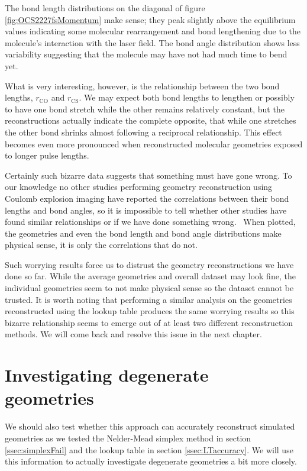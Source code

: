 The bond length distributions on the diagonal of figure \ref{fig:OCS2227fsMomentum} make sense; they peak slightly above the equilibrium values indicating some molecular rearrangement and bond lengthening due to the molecule's interaction with the laser field. The bond angle distribution shows less variability suggesting that the molecule may have not had much time to bend yet. %

What is very interesting, however, is the relationship between the two bond lengths, $r_\mathrm{CO}$ and $r_\mathrm{CS}$. We may expect both bond lengths to lengthen or possibly to have one bond stretch while the other remains relatively constant, but the reconstructions actually indicate the complete opposite, that while one stretches the other bond shrinks almost following a reciprocal relationship. This effect becomes even more pronounced when reconstructed molecular geometries exposed to longer pulse lengths.

Certainly such bizarre data suggests that something must have gone wrong. To our knowledge no other studies performing geometry reconstruction using Coulomb explosion imaging have reported the correlations between their bond lengths and bond angles, so it is impossible to tell whether other studies have found similar relationships or if we have done something wrong.\footnotemark~ When plotted, the geometries and even the bond length and bond angle distributions make physical sense, it is only the correlations that do not.


Such worrying results force us to distrust the geometry reconstructions we have done so far. While the average geometries and overall dataset may look fine, the individual geometries seem to not make physical sense so the dataset cannot be trusted. It is worth noting that performing a similar analysis on the geometries reconstructed using the lookup table produces the same worrying results so this bizarre relationship seems to emerge out of at least two different reconstruction methods. We will come back and resolve this issue in the next chapter.

\section{Investigating degenerate geometries}
We should also test whether this approach can accurately reconstruct simulated geometries as we tested the Nelder-Mead simplex method in section \ref{ssec:simplexFail} and the lookup table in section \ref{ssec:LTaccuracy}. We will use this information to actually investigate degenerate geometries a bit more closely.

